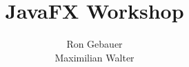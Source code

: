 \author{Ron Gebauer \\Maximilian Walter}
\title{JavaFX Workshop}
\begin{frame}
	\titlepage
\end{frame}